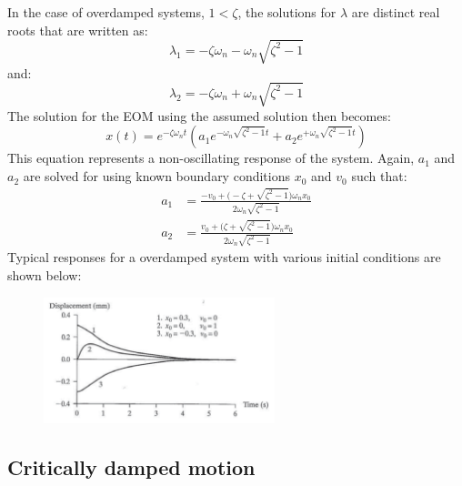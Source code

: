 \documentclass[12pt,a4paper]{article}
\begin{document}
			In the case of overdamped systems, $1<\zeta$, the solutions for $\lambda$ are distinct real roots that are written as:
			\begin{equation}
				\lambda_{1} = -\zeta\omega_n - \omega_n \sqrt{\zeta^2-1}
			\end{equation} 			
			and:
			\begin{equation}
				\lambda_{2} = -\zeta\omega_n + \omega_n \sqrt{\zeta^2-1}
			\end{equation} 
			The solution for the EOM using the assumed solution then becomes:
			\begin{equation}
				x(t) = e^{-\zeta\omega_nt}(a_1e^{-\omega_n \sqrt{\zeta^2-1}t} + a_2e^{+\omega_n \sqrt{\zeta^2-1}t}) 
			\end{equation}
			This equation represents a non-oscillating response of the system. Again, $a_1$ and $a_2$ are solved for using known boundary conditions $x_0$ and $v_0$ such that:
			\begin{align}
				a_1 &= \frac{-v_0+\Big(-\zeta+\sqrt{\zeta^2-1}\Big)\omega_n x_0}{2\omega_n\sqrt{\zeta^2-1}} \\ 
				a_2 &= \frac{v_0+\Big(\zeta+\sqrt{\zeta^2-1}\Big)\omega_n x_0}{2\omega_n\sqrt{\zeta^2-1}}
			\end{align}				
			Typical responses for a overdamped system with various initial conditions are shown below:
			\begin{figure}[H]
				\centering
				\includegraphics[width=0.6\textwidth]{../../Figures/Overdamped_system.png}
			\end{figure}
			
		\subsection*{Critically damped motion}
			
\end{document}
